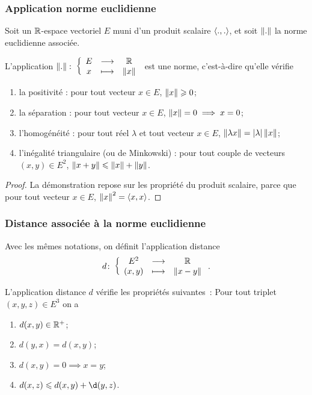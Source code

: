 \subsubsection{Application norme euclidienne}

Soit un $\mathbb{R}$-espace vectoriel $E$ muni d'un produit scalaire $\left\langle{.},{.}\right\rangle$, et soit $\left\lVert.\right\rVert$ la norme euclidienne associée.

\begin{prop}
  L'application $\left\lVert.\right\rVert\colon \left\{\begin{array}{ccc} E & \longrightarrow &\mathbb{R}\\ x & \longmapsto & \left\lVert x\right\rVert \end{array} \right.$ est une norme, c'est-à-dire qu'elle vérifie
  \begin{enumerate}
  \item la positivité : pour tout vecteur $x \in E$, $\left\lVert x\right\rVert \geqslant 0$;
  \item la séparation : pour tout vecteur $x \in E$, $\left\lVert x\right\rVert= 0 \implies x=0$;
  \item l'homogénéité : pour tout réel $\lambda$ et tout vecteur $x \in E$, $\left\lVert\lambda x\right\rVert=\left\lvert\lambda\right\rvert\left\lVert x\right\rVert$;
  \item l'inégalité triangulaire (ou de Minkowski) : pour tout couple de vecteurs $(x,y) \in E^2$, $\left\lVert x+y\right\rVert\leqslant \left\lVert x\right\rVert+\left\lVert y\right\rVert$.
  \end{enumerate}
\end{prop}
\begin{proof}
  La démonstration repose sur les propriété du produit scalaire, parce que pour tout vecteur $x \in E$, $\left\lVert x\right\rVert^2 = \left\langle{x},{x}\right\rangle$.
\end{proof}

\subsubsection{Distance associée à la norme euclidienne}

Avec les mêmes notations, on définit l'application distance
\begin{equation}
  d\colon \left\{\begin{array}{ccc} E^2 & \longrightarrow &\mathbb{R}\\ (x,y) & \longmapsto & \left\lVert x-y\right\rVert \end{array} \right..
\end{equation}
% 
\begin{prop}
  L'application distance $d$ vérifie les propriétés suivantes~: Pour tout triplet $(x,y,z) \in E^3$ on a
  \begin{enumerate}
  \item $d(x,y) \in \mathbb{R}^{+}$;
  \item $d(y,x)=d(x,y)$;
  \item $d(x,y)=0 \implies x=y$;
  \item $d(x,z)\leqslant d(x,y)+\d(y,z)$.
  \end{enumerate}
\end{prop}

